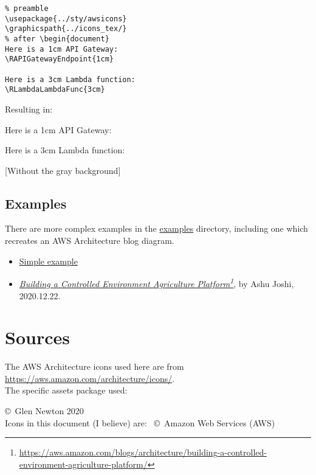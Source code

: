 \documentclass[12pt]{article}
\begin{document}
\begin{blockquote}
\begin{verbatim}
% preamble
\usepackage{../sty/awsicons} 
\graphicspath{../icons_tex/}
% after \begin{document}
Here is a 1cm API Gateway:
\RAPIGatewayEndpoint{1cm}

Here is a 3cm Lambda function:
\RLambdaLambdaFunc{3cm}

\end{verbatim}
\end{blockquote}

\noindent Resulting in:\\
\begin{blockquote}
Here is a 1cm API Gateway:
\RAPIGatewayEndpoint{1cm}

Here is a 3cm Lambda function:
\RLambdaLambdaFunc{3cm}

\end{blockquote}

[Without the gray background]
    
\subsection{Examples}
There are more complex examples in the \href{https://github.com/gnewton/awsArchIcons2LaTeX/tree/main/examples}{examples} directory, including one which recreates an AWS Architecture blog diagram.

\begin{itemize}
\item \href{https://github.com/gnewton/awsArchIcons2LaTeX/blob/main/examples/simple.pdf}{Simple example}
\item \textit{\href{https://github.com/gnewton/awsArchIcons2LaTeX/raw/main/examples/Data-pipeline-Grov-Technologies.pdf}{Building a Controlled Environment Agriculture Platform}\footnote{\url{https://aws.amazon.com/blogs/architecture/building-a-controlled-environment-agriculture-platform/}}}, by Ashu Joshi, 2020.12.22.
\end{itemize}
  
\section{Sources}
The AWS Architecture icons used here are from \url{https://aws.amazon.com/architecture/icons/}.\\
The specific assets package used: \href{https://d1.awsstatic.com/webteam/architecture-icons/Q32020/\assetZipFile}{\assetZipFile}

\vspace{3cm}
\noindent \copyright\ Glen Newton 2020\\
Icons in this document (I believe) are: \ \copyright\ Amazon Web Services (AWS)
\vspace{5mm}

\setlength{\parindent}{0pt}




\normalsize

\printindex
\printindex[macros]
\end{document}
